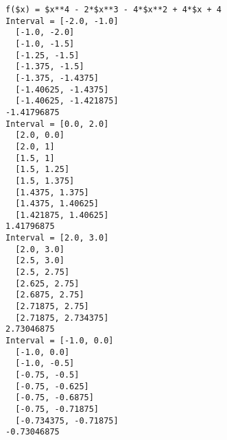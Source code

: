 \begin{verbatim}
f($x) = $x**4 - 2*$x**3 - 4*$x**2 + 4*$x + 4
Interval = [-2.0, -1.0]
  [-1.0, -2.0]
  [-1.0, -1.5]
  [-1.25, -1.5]
  [-1.375, -1.5]
  [-1.375, -1.4375]
  [-1.40625, -1.4375]
  [-1.40625, -1.421875]
-1.41796875
Interval = [0.0, 2.0]
  [2.0, 0.0]
  [2.0, 1]
  [1.5, 1]
  [1.5, 1.25]
  [1.5, 1.375]
  [1.4375, 1.375]
  [1.4375, 1.40625]
  [1.421875, 1.40625]
1.41796875
Interval = [2.0, 3.0]
  [2.0, 3.0]
  [2.5, 3.0]
  [2.5, 2.75]
  [2.625, 2.75]
  [2.6875, 2.75]
  [2.71875, 2.75]
  [2.71875, 2.734375]
2.73046875
Interval = [-1.0, 0.0]
  [-1.0, 0.0]
  [-1.0, -0.5]
  [-0.75, -0.5]
  [-0.75, -0.625]
  [-0.75, -0.6875]
  [-0.75, -0.71875]
  [-0.734375, -0.71875]
-0.73046875
\end{verbatim}
